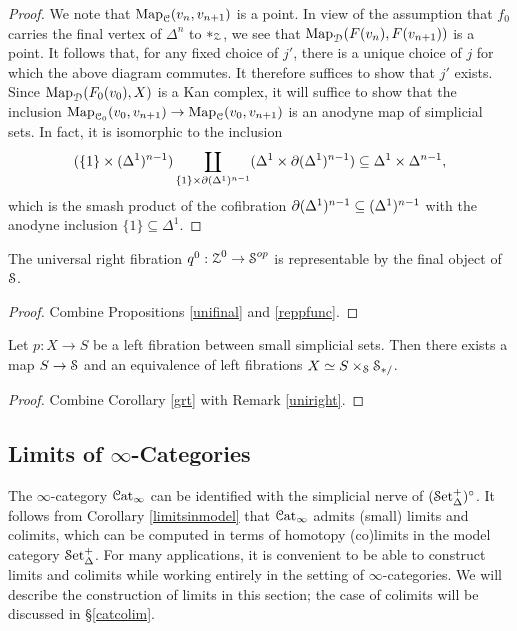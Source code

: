 \begin{proof}
We note that $\operatorname{{Map}}_{\operatorname{\mathcal{C}}}(v_{n},v_{n+1})$ is a point. In view of the assumption that
$f_0$ carries the final vertex of $\Delta^n$ to $\ast_{\operatorname{\mathcal{Z}}}$, we see that
$\operatorname{{Map}}_{\operatorname{\mathcal{D}}}( F(v_n), F(v_{n+1}))$ is a point. It follows that, for any fixed choice of $j'$, there is a unique choice of $j$ for which the above diagram commutes. It therefore suffices to show that $j'$ exists. Since $\operatorname{{Map}}_{ \operatorname{\mathcal{D}} }( F_0(v_0), X )$ is a Kan complex, it will suffice to show that the inclusion $\operatorname{{Map}}_{\operatorname{\mathcal{C}}_0}( v_0, v_{n+1}) \rightarrow \operatorname{{Map}}_{\operatorname{\mathcal{C}}}(v_0,v_{n+1})$ is an anodyne map of simplicial sets. In fact, it is isomorphic to the inclusion
$$ (\{1\} \times (\Delta^1)^{n-1}) \coprod_{ \{1\} \times \operatorname{\partial} (\Delta^1)^{n-1} }
(\Delta^1 \times \operatorname{\partial} (\Delta^1)^{n-1}) \subseteq \Delta^1 \times \Delta^{n-1},$$
which is the smash product of the cofibration $\operatorname{\partial} (\Delta^1)^{n-1} \subseteq (\Delta^1)^{n-1}$ with the anodyne inclusion $\{1\} \subseteq \Delta^1$.
\end{proof}

\begin{corollary}\label{grt}
The universal right fibration $q^0: \operatorname{\mathcal{Z}}^0 \rightarrow \operatorname{\mathcal{S}}^{op}$ is representable
by the final object of $\operatorname{\mathcal{S}}$.
\end{corollary}

\begin{proof}
Combine Propositions \ref{unifinal} and \ref{reppfunc}.
\end{proof}

\begin{corollary}\label{unipull}
Let $p: X \rightarrow S$ be a left fibration between small simplicial sets. Then there exists a map
$S \rightarrow \operatorname{\mathcal{S}}$ and an equivalence of left fibrations $X \simeq S \times_{\operatorname{\mathcal{S}}} \operatorname{\mathcal{S}}_{\ast/}$. 
\end{corollary}

\begin{proof}
Combine Corollary \ref{grt} with Remark \ref{uniright}.
\end{proof}

\subsection{Limits of $\infty$-Categories}\label{catlim}

The $\infty$-category $\operatorname{\mathcal{C}at}_{\infty}$ can be identified with the simplicial nerve of
$(\operatorname{\mathcal{S}et_{\Delta}^{+}})^{\circ}$. It follows from Corollary \ref{limitsinmodel} that $\operatorname{\mathcal{C}at}_{\infty}$ admits (small) limits and colimits, which can be computed in terms of homotopy (co)limits in the model category $\operatorname{\mathcal{S}et_{\Delta}^{+}}$. For many applications, it is convenient to be able to construct limits and colimits while working entirely in the setting of $\infty$-categories. We will describe the construction of limits in this section; the case of colimits will be discussed in \S \ref{catcolim}.

